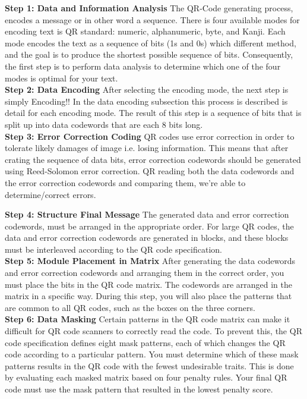 \textbf{Step 1: Data and Information Analysis}
The QR-Code generating process, encodes a message or in other word a sequence. There is four available modes for encoding text is QR standard: numeric, alphanumeric, byte, and Kanji. Each mode encodes the text as a sequence of bits (1s and 0s) which different method, and the goal is to produce the shortest possible sequence of bits. Consequently, the first step is to perform data analysis to determine which one of the four modes is optimal for your text.\\

\textbf{Step 2: Data Encoding}
After selecting the encoding mode, the next step is simply Encoding!! In the data encoding subsection this process is described is detail for each encoding mode. The result of this step is a sequence of bits that is split up into data codewords that are each 8 bits long.\\

\textbf{Step 3: Error Correction Coding}
QR codes use error correction in order to tolerate likely damages of image i.e. losing information. This means that after crating the sequence of data bits, error correction codewords should be generated using Reed-Solomon error correction. QR reading both the data codewords and the error correction codewords and comparing them, we're able to determine/correct errors.

\textbf{Step 4: Structure Final Message}
The generated data and error correction codewords, must be arranged in the appropriate order. For large QR codes, the data and error correction codewords are generated in blocks, and these blocks must be interleaved according to the QR code specification.\\

\textbf{Step 5: Module Placement in Matrix}
After generating the data codewords and error correction codewords and arranging them in the correct order, you must place the bits in the QR code matrix. The codewords are arranged in the matrix in a specific way. During this step, you will also place the patterns that are common to all QR codes, such as the boxes on the three corners.\\

\textbf{Step 6: Data Masking}
Certain patterns in the QR code matrix can make it difficult for QR code scanners to correctly read the code. To prevent this, the QR code specification defines eight mask patterns, each of which changes the QR code according to a particular pattern. You must determine which of these mask patterns results in the QR code with the fewest undesirable traits. This is done by evaluating each masked matrix based on four penalty rules. Your final QR code must use the mask pattern that resulted in the lowest penalty score.\\


